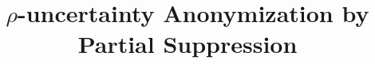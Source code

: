 \documentclass{elsarticle}
\begin{document}
\title{$\rho$-uncertainty Anonymization by Partial Suppression}

\author{
}

%
%



%
\end{document}
